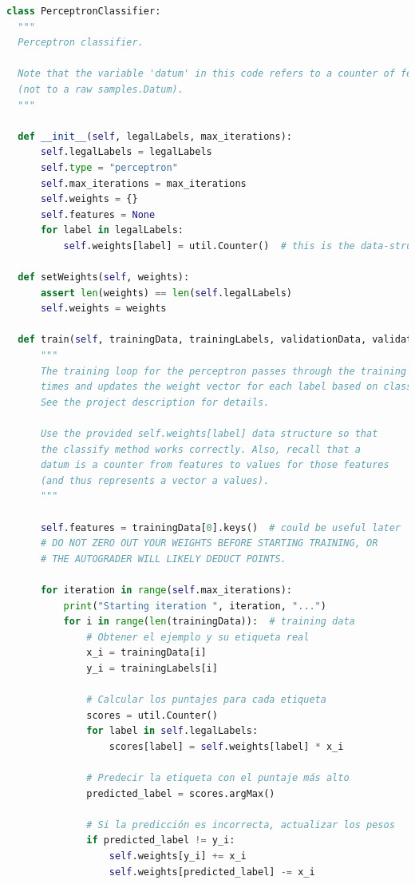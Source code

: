 \documentclass{report}
\begin{document}
          \begin{lstlisting}[language=Python, caption=Implementación final del perceptron]
class PerceptronClassifier:
  """
  Perceptron classifier.

  Note that the variable 'datum' in this code refers to a counter of features
  (not to a raw samples.Datum).
  """

  def __init__(self, legalLabels, max_iterations):
      self.legalLabels = legalLabels
      self.type = "perceptron"
      self.max_iterations = max_iterations
      self.weights = {}
      self.features = None
      for label in legalLabels:
          self.weights[label] = util.Counter()  # this is the data-structure you should use

  def setWeights(self, weights):
      assert len(weights) == len(self.legalLabels)
      self.weights = weights

  def train(self, trainingData, trainingLabels, validationData, validationLabels):
      """
      The training loop for the perceptron passes through the training data several
      times and updates the weight vector for each label based on classification errors.
      See the project description for details.

      Use the provided self.weights[label] data structure so that
      the classify method works correctly. Also, recall that a
      datum is a counter from features to values for those features
      (and thus represents a vector a values).
      """

      self.features = trainingData[0].keys()  # could be useful later
      # DO NOT ZERO OUT YOUR WEIGHTS BEFORE STARTING TRAINING, OR
      # THE AUTOGRADER WILL LIKELY DEDUCT POINTS.

      for iteration in range(self.max_iterations):
          print("Starting iteration ", iteration, "...")
          for i in range(len(trainingData)):  # training data
              # Obtener el ejemplo y su etiqueta real
              x_i = trainingData[i]
              y_i = trainingLabels[i]

              # Calcular los puntajes para cada etiqueta
              scores = util.Counter()
              for label in self.legalLabels:
                  scores[label] = self.weights[label] * x_i

              # Predecir la etiqueta con el puntaje más alto
              predicted_label = scores.argMax()

              # Si la predicción es incorrecta, actualizar los pesos
              if predicted_label != y_i:
                  self.weights[y_i] += x_i
                  self.weights[predicted_label] -= x_i


\end{lstlisting}
\end{document}
